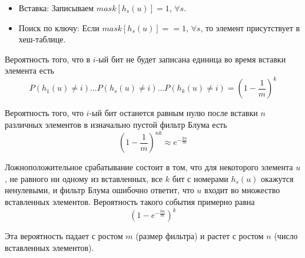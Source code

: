 \begin{itemize}
\item Вставка: Записываем $mask[h_s(u)] = 1$, $\forall s$.
\item Поиск по ключу: Если $mask[h_s(u)] == 1$, $\forall s$, то элемент присутствует в хеш-таблице.
\end{itemize}

Вероятность того, что в $i$-ый бит не будет записана единица во время вставки элемента есть 
$$P(h_1(u) \ne i)...P(h_s(u) \ne i)...P(h_k(u) \ne i) = \left( 1 - \frac{1}{m}\right)^k$$

Вероятность того, что $i$-ый бит останется равным нулю после вставки $n$ различных элементов в изначально пустой фильтр Блума есть 
$$\left( 1 - \frac{1}{m}\right)^{nk} \approx e^{-\frac{kn}{m}}$$

Ложноположительное срабатывание состоит в том, что для некоторого элемента $u$, не равного ни одному из вставленных, все $k$ бит с номерами $h_s(u)$ окажутся ненулевыми, и фильтр Блума ошибочно ответит, что $u$ входит во множество вставленных элементов. Вероятность такого события примерно равна
$$(1 - e^{-\frac{kn}{m}})^k$$

Эта вероятность падает с ростом $m$ (размер фильтра) и растет с ростом $n$ (число вставленных элементов).
